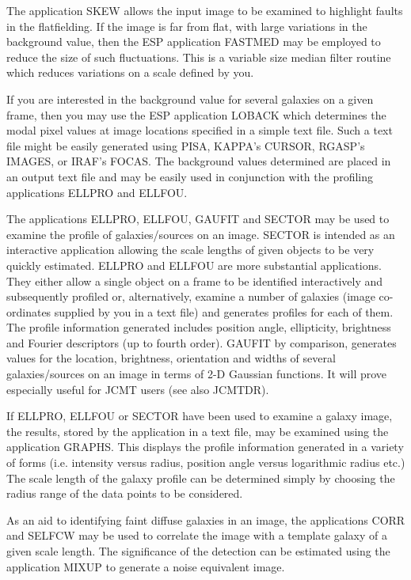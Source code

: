 \documentclass[twoside,11pt]{article}
\newcommand{\xref}[3]{#1}
\begin{document}
The application SKEW allows the input image to be examined to highlight
faults in the flatfielding.  If the image is far from flat, with large
variations in the background value, then the ESP application FASTMED
may be employed to reduce the size of such fluctuations. This is a
variable size median filter routine which reduces variations on a scale
defined by you.

If you are interested in the background value for several galaxies on a
given frame, then you may use the ESP application LOBACK which
determines the modal pixel values at image locations specified in a
simple text file. Such a text file might be easily generated using
\xref{PISA}{sun109}{}, \xref{KAPPA}{sun95}{}'s CURSOR, RGASP's IMAGES, or 
\xref{IRAF}{sun179}{}'s 
FOCAS. The background
values determined are placed in an output text file and may be easily
used in conjunction with the profiling applications ELLPRO and ELLFOU.

The applications ELLPRO, ELLFOU, GAUFIT and SECTOR may be used to examine the
profile of galaxies/sources on an image. SECTOR is intended as an interactive
application allowing the scale lengths of given objects to be very
quickly estimated. ELLPRO and ELLFOU are more substantial applications.
They either allow a single object on a frame to be identified
interactively and subsequently profiled or, alternatively, examine a
number of galaxies (image co-ordinates supplied by you in a text file)
and generates profiles for each of them.  The profile information
generated includes position angle, ellipticity, brightness and Fourier
descriptors (up to fourth order). GAUFIT by comparison, generates
values for the location, brightness, orientation and widths of several 
galaxies/sources on an image in terms of 2-D Gaussian functions. It will prove 
especially useful for JCMT users (see also \xref{JCMTDR}{sun132}{}).  

If ELLPRO, ELLFOU or SECTOR have been used to examine a galaxy image,
the results, stored by the application in a text file, may be examined 
using the application GRAPHS. This displays the profile information 
generated in a variety of forms (i.e. intensity versus radius, 
position angle versus logarithmic radius etc.) The scale length of the
galaxy profile can be determined simply by choosing the radius range 
of the data points to be considered.

As an aid to identifying faint diffuse galaxies in an image, the applications
CORR and SELFCW may be used to correlate the image with a template 
galaxy of a given scale length. The significance of the detection can
be estimated using the application MIXUP to generate a noise equivalent
image. 
\end{document}

